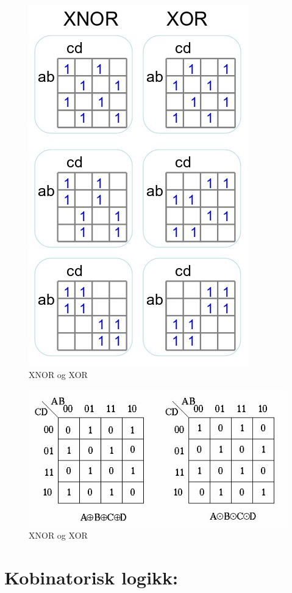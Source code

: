 \documentclass{article}
\begin{document}
	\begin{figure}[H]
		\includegraphics[scale = 0.7]{X.jpg}
		\caption{XNOR og XOR}
	\end{figure}
	
	\begin{figure}[H]
		\includegraphics[scale = 0.7]{x.jpg}
		\caption{XNOR og XOR}
	\end{figure}
	
	
	\section{Kobinatorisk logikk:}
	
\end{document}
